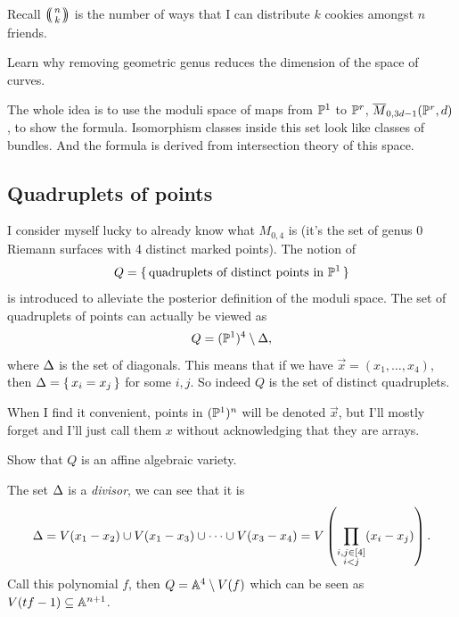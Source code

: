 \documentclass[12pt]{memoir}
\begin{document}
\begin{Rmk}
    Recall $\multinom{n}{k}$ is the number of ways that I can distribute $k$ cookies amongst $n$ friends.
\end{Rmk}

\begin{Ej}
Learn why removing geometric genus reduces the dimension of the space of curves.
\end{Ej}

\begin{ptcb}
\end{ptcb}

The whole idea is to use the moduli space of maps from $\mathbb{P}^1$ to $\mathbb{P}^r$, $\overline M_{0,3d-1}(\mathbb{P}^r,d)$, to show the formula. Isomorphism classes inside this set look like classes of bundles. And the formula is derived from intersection theory of this space. 

\subsection{Quadruplets of points}

I consider myself lucky to already know what $M_{0,4}$ is (it's the set of genus 0 Riemann surfaces with 4 distinct marked points). The notion of 
$$Q=\{\,\text{quadruplets of distinct points in }\mathbb{P}^1\,\}$$
is introduced to alleviate the posterior definition of the moduli space. The set of quadruplets of points can actually be viewed as 
$$Q=(\mathbb{P}^1)^4\setminus\Delta,$$
where $\Delta$ is the set of diagonals. This means that if we have $\vec x=(x_1,\dots,x_4)$, then $\Delta=\{\,x_i=x_j\,\}$ for some $i,j$. So indeed $Q$ is the set of distinct quadruplets. 

\begin{Rmk}
    When I find it convenient, points in $(\mathbb{P}^1)^n$ will be denoted $\vec x$, but I'll mostly forget and I'll just call them $x$ without acknowledging that they are arrays.
\end{Rmk}

\begin{Ej}
Show that $Q$ is an affine algebraic variety. 
\end{Ej}

\begin{ptcb}
    The set $\Delta$ is a \emph{divisor}, we can see that it is 
    $$\Delta=V(x_1-x_2)\cup V(x_1-x_3)\cup\cdots\cup V(x_3-x_4)=V\left(\prod_{\substack{i,j\in\left\lbrack4\right\rbrack\\ i<j}}(x_i-x_j)\right).$$
    Call this polynomial $f$, then $Q=\mathbb{A}^4\setminus V(f)$ which can be seen as $V(tf-1)\subseteq \mathbb{A}^{n+1}$.
    \end{ptcb}
\end{document}
